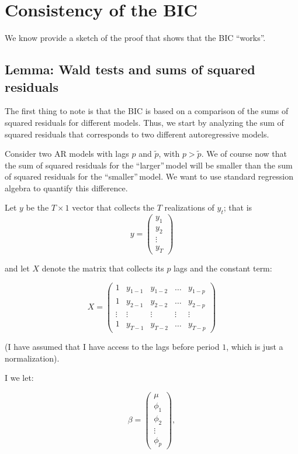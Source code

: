\documentclass[12] {article}
\begin{document}
\section{Consistency of the BIC}

We know provide a sketch of the proof that shows that the BIC ``works\textquotedblright. 

\subsection{Lemma: Wald tests and sums of squared residuals}

The first thing to note is that the BIC is based on a comparison of the sums of squared residuals for different models. Thus, we start by analyzing the sum of squared residuals that corresponds to two different autoregressive models. 


Consider two AR models with lags $p$ and $\tilde{p}$, with $p>\tilde{p}$. We of course now that the sum of squared residuals for the ``larger\textquotedblright\,model will be smaller than the sum of squared residuals for the ``smaller\textquotedblright \,model. We want to use standard regression algebra to quantify this difference. 

Let $y$ be the $T \times 1$ vector that collects the $T$ realizations of $y_t$; that is 
\[ y= \begin{pmatrix} y_1 \\ y_2 \\ \vdots \\ y_{T} \end{pmatrix} \]

\noindent and let $X$ denote the matrix that collects its $p$ lags and the constant term: 

\[ X = \begin{pmatrix} 1 &y_{1-1} &y_{1-2}& \ldots & y_{1-p} \\ 
1 &y_{2-1} &y_{2-2}& \ldots & y_{2-p}\\
\vdots & \vdots & \vdots & \vdots & \vdots \\
1 &y_{T-1} &y_{T-2}& \ldots & y_{T-p}
 \end{pmatrix}  \]

\noindent (I have assumed that I have access to the lags before period $1$, which is just a normalization). 

I we let:

\[ \beta = \begin{pmatrix} \mu \\ \phi_1 \\ \phi_2 \\ \vdots \\ \phi_p \end{pmatrix}, \]
\end{document}

